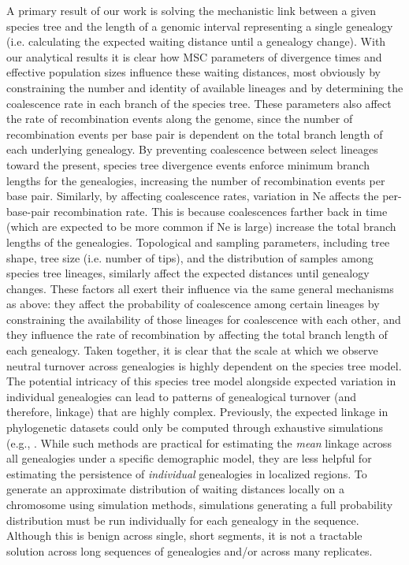 \documentclass[11pt]{article}
\begin{document}
A primary result of our work is solving the mechanistic link between a given species tree 
and the length of a genomic interval representing a single genealogy 
(i.e. calculating the expected waiting distance until a genealogy change). 
With our analytical results it is clear how MSC parameters of divergence times and 
effective population sizes influence these waiting distances, most obviously 
by constraining the number and identity of available lineages and by determining 
the coalescence rate in each branch of the species tree. 
These parameters also affect the rate of recombination events along the genome, since the 
number of recombination events per base pair is dependent on the total branch 
length of each underlying genealogy. By preventing coalescence between select lineages toward the present, 
species tree divergence events enforce minimum branch lengths for the genealogies, 
increasing the number of recombination events per base pair. Similarly, by affecting coalescence rates, variation in Ne 
affects the per-base-pair recombination rate. This is because coalescences farther back in time 
(which are expected to be more common if Ne is large)
increase the total branch lengths of the genealogies.
Topological and sampling parameters, including tree shape, tree size (i.e. number of tips), 
and the distribution of samples among species tree 
lineages, similarly affect the expected distances until genealogy 
changes. These factors all exert their influence via the same general mechanisms as above: they affect the 
probability of coalescence among certain lineages by constraining the availability of those lineages 
for coalescence with each other, and they influence the 
rate of recombination by affecting the total branch length of each genealogy. 
Taken together, it is clear that the scale at which we observe neutral turnover across 
genealogies is highly dependent on the species tree model. The potential 
intricacy of this species tree model alongside expected variation in individual genealogies 
can lead to patterns of genealogical turnover (and therefore, linkage) that are highly complex. 
Previously, the expected linkage in phylogenetic datasets could only be computed 
through exhaustive simulations (e.g., \citep{mckenzie_multispecies_2020}. While such methods
are practical for estimating the \emph{mean} linkage across all genealogies under a 
specific demographic model, they are less helpful for estimating the 
persistence of \emph{individual} genealogies in localized regions. To generate an approximate distribution 
of waiting distances locally on a chromosome using simulation methods, 
simulations generating a full probability distribution must be 
run individually for each genealogy in the sequence. 
Although this is benign across single, short segments, it is not a tractable solution across long 
sequences of genealogies and/or across many replicates. 
\end{document}
